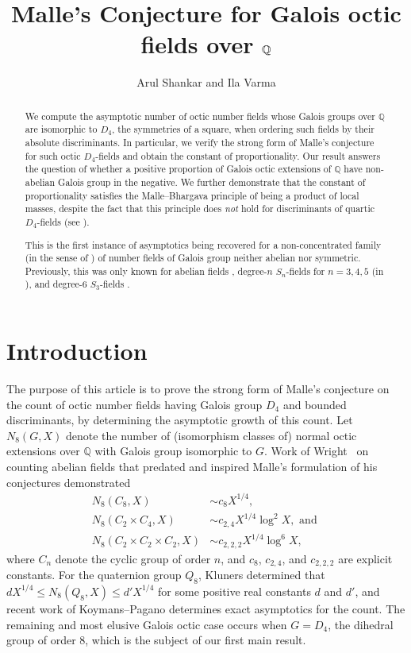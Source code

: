 \documentclass[10pt]{article}
\title{Malle's Conjecture for Galois octic fields over $\bQ$}
\author{Arul Shankar and Ila Varma}
\theoremstyle{plain}
\theoremstyle{definition}
\theoremstyle{remark}
\def\bQ{{\mathbb Q}}
\def\bQ{{\mathbb Q}}
\begin{document}
\maketitle


\begin{abstract}
We compute the asymptotic number of octic number fields whose Galois
groups over $\bQ$ are isomorphic to $D_4$, the symmetries of a square,
when ordering such fields by their absolute discriminants. In
particular, we verify the strong form of Malle's conjecture
\cite{MR2068887} for such octic $D_4$-fields and obtain the constant of
proportionality. Our result answers the question of whether a positive
proportion of Galois octic extensions of $\bQ$ have non-abelian Galois
group in the negative. We further demonstrate that the constant of
proportionality satisfies the Malle--Bhargava principle
\cite{MR2068887,MR2354798} of being a product of local masses, despite
the fact that this principle does {\em not} hold for discriminants of
quartic $D_4$-fields (see \cite{MR1918290,D4preprint}).

This is the first instance of asymptotics being recovered for a
non-concentrated family (in the sense of \cite{ALWWPreprint}) of
number fields of Galois group neither abelian nor
symmetric. Previously, this was only known for abelian fields
\cite{MR969545}, degree-$n$ $S_n$-fields for $n=3,4,5$ (in
\cite{MR491593,MR2183288,MR2745272}), and degree-$6$ $S_3$-fields
\cite{MR2373587}.
\end{abstract}




%
\section{Introduction}

The purpose of this article is to prove the strong form of Malle's
conjecture \cite{MR2068887} on the count of octic number
fields having Galois group $D_4$ and bounded discriminants, by determining the asymptotic growth of this count. Let
$N_8(G,X)$ denote the number of (isomorphism classes of) normal octic
extensions over $\bQ$ with Galois group isomorphic to $G$. Work of
Wright~\cite{MR969545} on counting abelian fields that predated and inspired
Malle's formulation of his conjectures demonstrated
\begin{align*}
N_8(C_8,X) &\sim c_8X^{1/4}, \\
N_8(C_2 \times C_4, X) &\sim c_{2,4}X^{1/4} \log^2 X, \mbox{ and } \\
N_8(C_2 \times C_2 \times C_2, X) &\sim c_{2,2,2}X^{1/4} \log^6 X,
\end{align*}
where $C_n$ denote the cyclic group of order $n$, and $c_8$, $c_{2,4}$, and $c_{2,2,2}$ are explicit constants.
For the quaternion group $Q_8$, Kluners \cite{habilitation} determined
that $dX^{1/4} \leq N_8(Q_8,X) \leq d'X^{1/4}$ for some positive real
constants $d$ and $d'$, and recent work of Koymans--Pagano \cite{KP}determines exact asymptotics for the count. The remaining and most elusive Galois octic
case occurs when $G = D_4$, the dihedral group of order 8, which is
the subject of our first main result.
  
\end{document}
